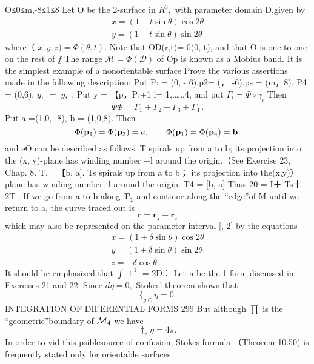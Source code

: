 O≤0≤m,-8≤1≤8 Let O be the 2-surface in $\textstyle R^{3},$ with parameter domain D,given by $$ \begin{array}{c}{{x=(1-t\sin\theta)\cos2\theta}}\\ {{y=(1-t\sin\theta)\sin2\theta}}\end{array} $$ where（ $x,y,z)=\Phi(\theta,t).$ Note that OD(r,t)= 0(0,-t), and that O is one-to-one on the rest of $\underline{{f}}$ The range $\mathcal{M}=\Phi(\mathcal{D})$ of Op is known as a Mobius band. It is the simplest example of a nonorientable surface Prove the various assertions made in the following description: Put P: = (0, - 6),p2= (， -6),ps = (m，8), P4 = (0,6), $\scriptstyle y,\;=\;y,$ . Put y = 【p，P:+1 i= 1,.….,4, and put $\Gamma_{i}=\Phi\circ\gamma_{i}$ Then $$ \bar{\Phi}\Phi=\Gamma_{1}+\Gamma_{2}+\Gamma_{3}+\Gamma_{4}\,. $$ Put a =(1,0, -8), b = (1,0,8). Then $$ \Phi({\bf p}_{1})=\Phi({\bf p}_{3})=a,\qquad\Phi({\bf p}_{1})=\Phi({\bf p}_{4})={\bf b}, $$ and eO can be described as follows. T spirals up from a to b; its projection into the (x, y)-plane has winding number +l around the origin.（See Exercise 23, Chap. 8. T.= 【b, a]. Ts spirals up from a to b； its projection into the(x,y)） plane has winding number -l around the origin. T4 = [b, a] Thus 20 = I＋ Ts十2T . If we go from a to b along $\mathbf{T_{1}}$ and continue along the “edge”of M until we return to a, the curve traced out is $$ \mathbf{r}=\mathbf{r}_{z}-\mathbf{r}_{z} $$ which may also be represented on the parameter interval [, 2] by the equations $$ \begin{array}{c}{{x=(1+\delta\sin\theta)\cos2\theta}}\\ {{y=(1+\delta\sin\theta)\sin2\theta}}\\ {{z=-\delta\cos\theta.}}\end{array} $$ It should be emphasized that $\textstyle\int\!\!\!\!\!\perp^{1}$ = 2D： Let n be the 1-form discussed in Exercises 21 and 22. Since $d\eta=0,$ Stokes' theorem shows that $$ \Bigr\{_{g\oplus}\eta=0. $$INTEGRATION OF DIFERENTIAL FORMS 299 But although $\prod$ is the “geometric”boundary of ${\cal M}_{4}$ we have $$ \dagger_{\mathrm{r}}\eta=4\pi. $$ In order to vid this psiblesource of confusion, Stokes formula （Theorem 10.50) is frequently stated only for orientable surfaces
